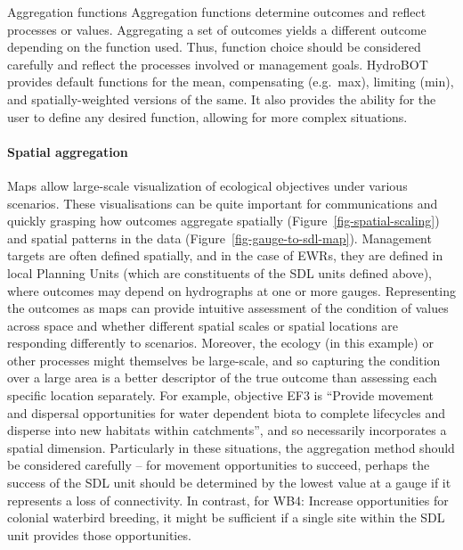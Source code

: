 \documentclass[
  number]{elsarticle}
\let\oldparagraph\paragraph
\renewcommand{\paragraph}[1]{\oldparagraph{#1}\mbox{}}
\begin{document}
Aggregation functions Aggregation functions determine outcomes and
reflect processes or values. Aggregating a set of outcomes yields a
different outcome depending on the function used. Thus, function choice
should be considered carefully and reflect the processes involved or
management goals. HydroBOT provides default functions for the mean,
compensating (e.g.~max), limiting (min), and spatially-weighted versions
of the same. It also provides the ability for the user to define any
desired function, allowing for more complex situations.

\hypertarget{spatial-aggregation}{%
\paragraph{Spatial aggregation}\label{spatial-aggregation}}

Maps allow large-scale visualization of ecological objectives under
various scenarios. These visualisations can be quite important for
communications and quickly grasping how outcomes aggregate spatially
(Figure~\ref{fig-spatial-scaling}) and spatial patterns in the data
(Figure~\ref{fig-gauge-to-sdl-map}). Management targets are often
defined spatially, and in the case of EWRs, they are defined in local
Planning Units (which are constituents of the SDL units defined above),
where outcomes may depend on hydrographs at one or more gauges.
Representing the outcomes as maps can provide intuitive assessment of
the condition of values across space and whether different spatial
scales or spatial locations are responding differently to scenarios.
Moreover, the ecology (in this example) or other processes might
themselves be large-scale, and so capturing the condition over a large
area is a better descriptor of the true outcome than assessing each
specific location separately. For example, objective EF3 is ``Provide
movement and dispersal opportunities for water dependent biota to
complete lifecycles and disperse into new habitats within catchments'',
and so necessarily incorporates a spatial dimension. Particularly in
these situations, the aggregation method should be considered carefully
-- for movement opportunities to succeed, perhaps the success of the SDL
unit should be determined by the lowest value at a gauge if it
represents a loss of connectivity. In contrast, for WB4: Increase
opportunities for colonial waterbird breeding, it might be sufficient if
a single site within the SDL unit provides those opportunities.
\end{document}
